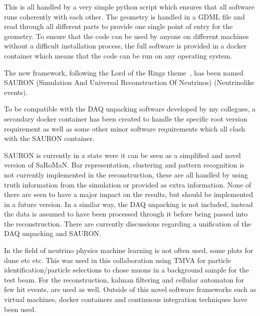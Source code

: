 This is all handled by a very simple python script which ensures that all software runs coherently with each other. The geometry is handled in a GDML file and read through all different parts to provide one single point of entry for the geometry. To ensure that the code can be used by anyone on different machines without a difficult installation process, the full software is provided in a docker container which means that the code can be run on any operating system. 

The new framework, following the Lord of the Rings theme~\cite{79tolkien2012lord}, has been named SAURON (Simulation And Universal Reconstruction Of Neutrinos) (Neutrinolike events).

To be compatible with the DAQ unpacking software developed by my collegues, a secondary docker container has been created to handle the specific root version requirement as well as some other minor software requirements which all clash with the SAURON container.

SAURON is currently in a state were it can be seen as a simplified and novel version of SaRoMaN. Bar representation, clustering and pattern recognition is not currently implemented in the reconstruction, these are all handled by using truth information from the simulation or provided as extra information. None of there are seen to have a major impact on the results, but should be implemented in a future version. In a similar way, the DAQ unpacking is not included, instead the data is assumed to have been processed through it before being passed into the reconstruction. There are currently discussions regarding a unification of the DAQ unpacking and SAURON.

In the field of neutrino physics machine learning  is not often used, some plots for dune etc etc. This was used in this collaboration using TMVA for particle identification/particle selections to chose muons in a background sample for the test beam.
For the reconstruction, kalman filtering and cellular automaton for few hit events, are used as well.
Outside of this novel software frameworks such as virtual machines, docker containers and continuous integration techniques have been used.

